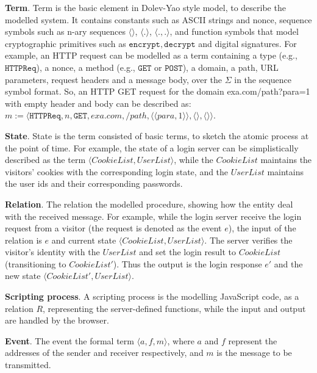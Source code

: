 \vspace{1mm}
\noindent\textbf{Term}. Term is the basic element in Dolev-Yao style model, to describe the modelled system. 
It contains constants such as ASCII strings and nonce, sequence symbols such as n-ary sequences $\langle \rangle$, $\langle . \rangle$, $\langle . ,. \rangle$, and function symbols that model cryptographic primitives such as $\mathtt{encrypt}, \mathtt{decrypt}$ and digital signatures.
For example, an HTTP request can be modelled as a term containing a type (e.g., $\mathtt{HTTPReq}$), a nonce, a method (e.g., $\mathtt{GET}$ or $\mathtt{POST}$), a domain, a path, URL parameters, request headers and a message body, over the $\Sigma$ in the sequence symbol format. So,
an HTTP GET request for the domain {\sf exa.com/path?para=1} with empty header and body can be described as: $m:=\langle\mathtt{HTTPReq},n,\mathtt{GET},exa.com,/path,\langle \langle para, 1\rangle \rangle ,\langle \rangle,\langle \rangle \rangle$.

\vspace{1mm}
\noindent\textbf{State}. State is the term consisted of basic terms, to sketch the atomic process at the point of time. For example, the state of a login server can be simplistically described as the term $\langle CookieList,UserList \rangle$, while the $CookieList$ maintains the visitors' cookies with the corresponding login state, and the $UserList$ maintains the user ids and their corresponding passwords.


\vspace{1mm}
\noindent\textbf{Relation}. The relation the modelled procedure, showing how the entity deal with the received message. For example, while the login server receive the login request from a visitor (the request is denoted as the event $e$), the input of the relation is $e$ and current state $\langle CookieList,UserList \rangle$.   The server verifies the visitor's identity with the $UserList$ and set the login result to $CookieList$ (transitioning to $CookieList'$). Thus the output is the login response $e'$ and the new state $\langle CookieList',UserList \rangle$. 


\vspace{1mm}
\noindent\textbf{Scripting process}. A scripting process is the modelling JavaScript code, as a relation $R$, representing the server-defined functions, while the input and output are handled by the browser.


\vspace{1mm}
\noindent\textbf{Event}. The event  the formal term $\langle a, f, m \rangle$, where $a$ and $f$ represent the addresses of the sender and receiver respectively, and $m$ is the message to be transmitted.





